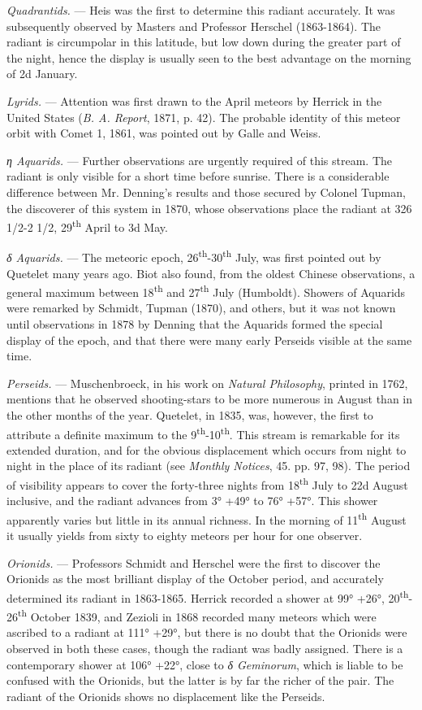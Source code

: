\documentclass[a4paper, 12pt, oneside, polutonikogreek, english]{article}
\begin{document}
\emph{Quadrantids.} --- Heis was the first to determine this radiant accurately. It was subsequently observed by Masters and Professor Herschel (1863-1864). The radiant is circumpolar in this latitude, but low down during the greater part of the night, hence the display is usually seen to the best advantage on the morning of 2d January.

\emph{Lyrids.} --- Attention was first drawn to the April meteors by Herrick in the United States (\emph{B. A. Report}, 1871, p. 42). The probable identity of this meteor orbit with Comet 1, 1861, was pointed out by Galle and Weiss.

\emph{η Aquarids.} --- Further observations are urgently required of this stream. The radiant is only visible for a short time before sunrise. There is a considerable difference between Mr. Denning's results and those secured by Colonel Tupman, the discoverer of this system in 1870, whose observations place the radiant at 326 1/2-2 1/2, 29\textsuperscript{th} April to 3d May.

\emph{δ Aquarids.} --- The meteoric epoch, 26\textsuperscript{th}-30\textsuperscript{th} July, was first pointed out by Quetelet many years ago. Biot also found, from the oldest Chinese observations, a general maximum between 18\textsuperscript{th} and 27\textsuperscript{th} July (Humboldt). Showers of Aquarids were remarked by Schmidt, Tupman (1870), and others, but it was not known until observations in 1878 by Denning that the Aquarids formed the special display of the epoch, and that there were many early Perseids visible at the same time.

\emph{Perseids.} --- Muschenbroeck, in his work on \emph{Natural Philosophy}, printed in 1762, mentions that he observed shooting-stars to be more numerous in August than in the other months of the year. Quetelet, in 1835, was, however, the first to attribute a definite maximum to the 9\textsuperscript{th}-10\textsuperscript{th}. This stream is remarkable for its extended duration, and for the obvious displacement which occurs from night to night in the place of its radiant (see \emph{Monthly Notices}, 45. pp. 97, 98). The period of visibility appears to cover the forty-three nights from 18\textsuperscript{th} July to 22d August inclusive, and the radiant advances from 3° +49° to 76° +57°. This shower apparently varies but little in its annual richness. In the morning of 11\textsuperscript{th} August it usually yields from sixty to eighty meteors per hour for one observer.

\emph{Orionids.} --- Professors Schmidt and Herschel were the first to discover the Orionids as the most brilliant display of the October period, and accurately determined its radiant in 1863-1865. Herrick recorded a shower at 99° +26°, 20\textsuperscript{th}-26\textsuperscript{th} October 1839, and Zezioli in 1868 recorded many meteors which were ascribed to a radiant at 111° +29°, but there is no doubt that the Orionids were observed in both these cases, though the radiant was badly assigned. There is a contemporary shower at 106° +22°, close to \emph{δ Geminorum}, which is liable to be confused with the Orionids, but the latter is by far the richer of the pair. The radiant of the Orionids shows no displacement like the Perseids.
\end{document}
